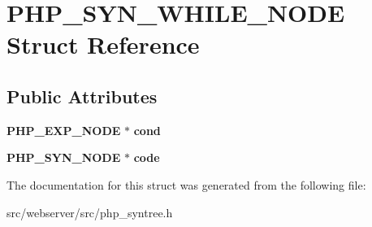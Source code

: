 \section{PHP\_\-SYN\_\-WHILE\_\-NODE Struct Reference}
\label{structPHP__SYN__WHILE__NODE}
\subsection*{Public Attributes}
\begin{DoxyCompactItemize}
\item 
{\bf PHP\_\-EXP\_\-NODE} $\ast$ {\bfseries cond}\label{structPHP__SYN__WHILE__NODE_a2a248adfb76d460cce6c674b3280ea87}

\item 
{\bf PHP\_\-SYN\_\-NODE} $\ast$ {\bfseries code}\label{structPHP__SYN__WHILE__NODE_a0c51508440304b7c48c84cad0d6e3164}

\end{DoxyCompactItemize}


The documentation for this struct was generated from the following file:\begin{DoxyCompactItemize}
\item 
src/webserver/src/php\_\-syntree.h\end{DoxyCompactItemize}
